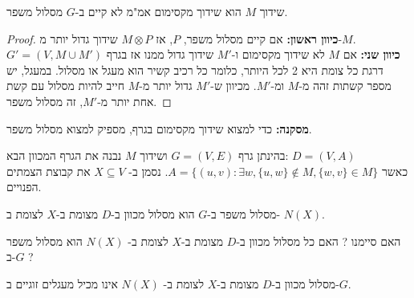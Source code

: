 \begin{theorem}
שידוך $M$ הוא שידוך מקסימום אמ"מ לא קיים ב-$G$ מסלול משפר.
\end{theorem}

\begin{proof}
\textbf{כיוון ראשון:}
אם קיים מסלול משפר, $P$, אז 
$M \otimes P$
שידוך גדול יותר מ-$M$.
\\
\textbf{כיוון שני:}
אם $M$ לא שידוך מקסימום ו-$M'$ שידוך גדול ממנו אז בגרף 
$G' = (V, M \cup M')$
דרגת כל צומת היא 2 לכל היותר, כלומר כל רכיב קשיר הוא מעגל או מסלול.
במעגל, יש מספר קשתות זהה מ-$M$ ומ-$M'$.
מכיוון ש-$M'$ גדול יותר מ-$M$ חייב להיות מסלול עם קשת אחת יותר מ-$M'$, זה מסלול משפר.
\end{proof}

\textbf{מסקנה:}
כדי למצוא שידוך מקסימום בגרף, מספיק למצוא מסלול משפר.

בהינתן גרף 
$G = (V, E)$
ושידוך $M$ נבנה את הגרף המכוון הבא:
$D = (V, A)$
\\
כאשר 
$A = \{(u, v) : \exists w, \{u, w\} \notin M, \{w, v\} \in M\}$.
נסמן ב-%
$X \subseteq V$
את קבוצת הצמתים הפנויים.
\begin{claim}
מסלול משפר ב-$G$ הוא מסלול מכוון ב-$D$ מצומת ב-$X$ לצומת ב-%
$N(X)$.
\end{claim}
האם סיימנו ? האם כל מסלול מכוון ב-$D$ מצומת ב-$X$ לצומת ב-%
$N(X)$
הוא מסלול משפר ב-$G$ ?
\begin{claim}
מסלול מכוון ב-$D$ מצומת ב-$X$ לצומת ב-%
$N(X)$
אינו מכיל מעגלים זוגיים ב-$G$.
\end{claim}

